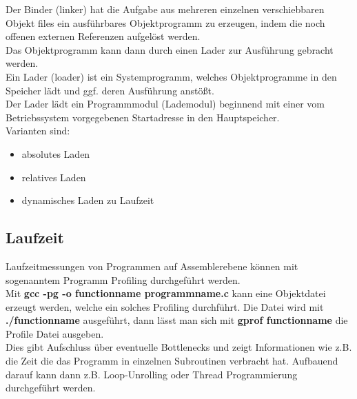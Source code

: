 \documentclass[a4paper,12pt,leqno]{article}
\begin{document}
Der Binder (linker) hat die Aufgabe aus mehreren einzelnen verschiebbaren Objekt files ein ausführbares Objektprogramm zu erzeugen, indem die noch offenen externen Referenzen aufgelöst werden.\\
Das Objektprogramm kann dann durch einen Lader zur Ausführung gebracht werden.\\
Ein Lader (loader) ist ein Systemprogramm, welches Objektprogramme in den Speicher lädt und ggf. deren Ausführung anstößt.\\
Der Lader lädt ein Programmmodul (Lademodul) beginnend mit einer vom Betriebssystem vorgegebenen Startadresse in den Hauptspeicher.\\
Varianten sind:
\begin{itemize}
\item absolutes Laden
\item relatives Laden
\item dynamisches Laden zu Laufzeit
\end{itemize}

\subsection{Laufzeit}

Laufzeitmessungen von Programmen auf Assemblerebene können mit sogenanntem Programm Profiling durchgeführt werden.\\
Mit \textbf{gcc -pg -o functionname programmname.c} kann eine Objektdatei erzeugt werden, welche ein solches Profiling durchführt. Die Datei wird mit \textbf{./functionname} ausgeführt, dann lässt man sich mit \textbf{gprof functionname} die Profile Datei ausgeben.\\
Dies gibt Aufschluss über eventuelle Bottlenecks und zeigt Informationen wie z.B. die Zeit die das Programm in einzelnen Subroutinen verbracht hat. Aufbauend darauf kann dann z.B. Loop-Unrolling oder Thread Programmierung durchgeführt werden.
\end{document}

